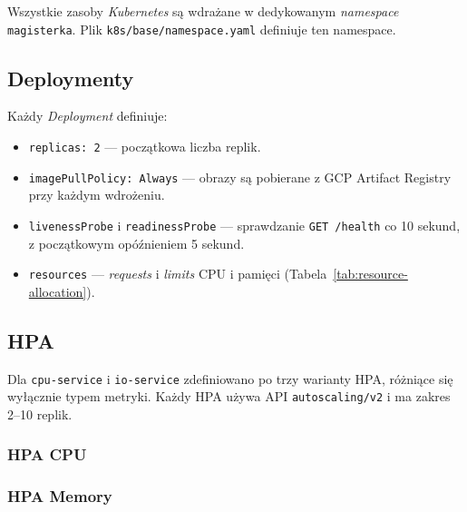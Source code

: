 Wszystkie zasoby \textit{Kubernetes} są wdrażane w dedykowanym \textit{namespace} \texttt{magisterka}. Plik \texttt{k8s/base/namespace.yaml} definiuje ten namespace.

\subsection{Deploymenty}

Każdy \textit{Deployment} definiuje:
\begin{itemize}
  \item \texttt{replicas: 2} — początkowa liczba replik.
  \item \texttt{imagePullPolicy: Always} — obrazy są pobierane z GCP Artifact Registry przy każdym wdrożeniu.
  \item \texttt{livenessProbe} i \texttt{readinessProbe} — sprawdzanie \texttt{GET /health} co 10 sekund, z początkowym opóźnieniem 5 sekund.
  \item \texttt{resources} — \textit{requests} i \textit{limits} CPU i pamięci (Tabela~\ref{tab:resource-allocation}).
\end{itemize}



\subsection{HPA}

Dla \texttt{cpu-service} i \texttt{io-service} zdefiniowano po trzy warianty HPA, różniące się wyłącznie typem metryki. Każdy HPA używa API \texttt{autoscaling/v2} i ma zakres 2--10 replik.

\subsubsection{HPA CPU}



\subsubsection{HPA Memory}

